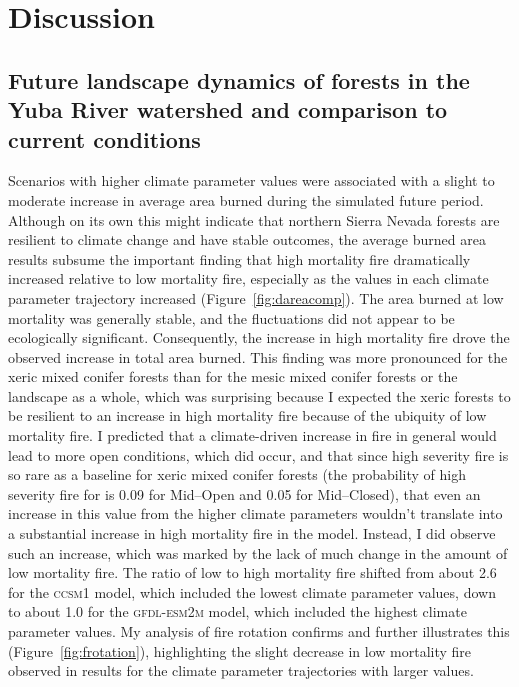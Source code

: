 \section{Discussion}

\subsection*{Future landscape dynamics of forests in the Yuba River watershed and comparison to current conditions}

Scenarios with higher climate parameter values were associated with a slight to moderate increase in average area burned during the simulated future period. Although on its own this might indicate that northern Sierra Nevada forests are resilient to climate change and have stable outcomes, the average burned area results subsume the important finding that high mortality fire dramatically increased relative to low mortality fire, especially as the values in each climate parameter trajectory increased (Figure~\ref{fig:dareacomp}). The area burned at low mortality was generally stable, and the fluctuations did not appear to be ecologically significant. Consequently, the increase in high mortality fire drove the observed increase in total area burned. This finding was more pronounced for the xeric mixed conifer forests than for the mesic mixed conifer forests or the landscape as a whole, which was surprising because I expected the xeric forests to be resilient to an increase in high mortality fire because of the ubiquity of low mortality fire. I predicted that a climate-driven increase in fire in general would lead to more open conditions, which did occur, and that since high severity fire is so rare as a baseline for xeric mixed conifer forests (the probability of high severity fire for is 0.09 for Mid--Open and 0.05 for Mid--Closed), that even an increase in this value from the higher climate parameters wouldn't translate into a substantial increase in high mortality fire in the model. Instead, I did observe such an increase, which was marked by the lack of much change in the amount of low mortality fire. The ratio of low to high mortality fire shifted from about 2.6 for the \textsc{ccsm1} model, which included the lowest climate parameter values, down to about 1.0 for the \textsc{gfdl-esm2m} model, which included the highest climate parameter values. My analysis of fire rotation confirms and further illustrates this (Figure~\ref{fig:frotation}), highlighting the slight decrease in low mortality fire observed in results for the climate parameter trajectories with larger values. 

